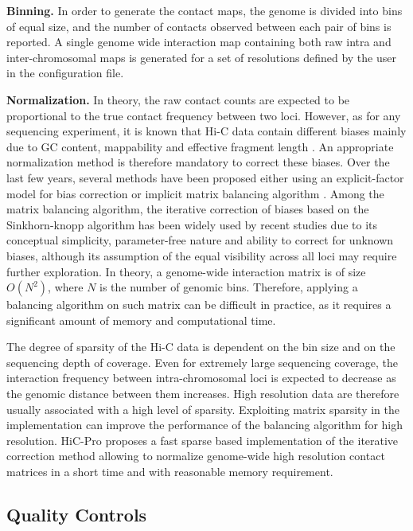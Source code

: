 \textbf{Binning.} In order to generate the contact maps, the genome is divided
into bins of equal size, and the number of contacts observed between each pair
of bins is reported. A single genome wide interaction map containing both raw
intra and inter-chromosomal maps is generated for a set of resolutions defined
by the user in the configuration file.

\textbf{Normalization.} In theory, the raw contact counts are expected to be
proportional to the true contact frequency between two loci. However, as for
any sequencing experiment, it is known that Hi-C data contain different biases
mainly due to GC content, mappability and effective fragment length
\citep{yaffe:probabilistic, hu:hicnorm}. An appropriate normalization method
is therefore mandatory to correct these biases. Over the last few years,
several methods have been proposed either using an explicit-factor model for
bias correction \citep{hu:hicnorm} or implicit matrix balancing algorithm
\citep{imakaev:iterative, cournac:normalization}. Among the matrix balancing
algorithm, the iterative correction of biases based on the Sinkhorn-knopp
algorithm has been widely used by recent studies due to its conceptual
simplicity, parameter-free nature and ability to correct for unknown biases,
although its assumption of the equal visibility across all loci may require
further exploration. In theory, a genome-wide interaction matrix is of size
$O(N^2)$, where $N$ is the number of genomic bins. Therefore, applying a
balancing algorithm on such matrix can be difficult in practice, as it
requires a significant amount of memory and computational time.

The degree of sparsity of the Hi-C data is dependent on the bin size and on
the sequencing depth of coverage. Even for extremely large sequencing
coverage, the interaction frequency between intra-chromosomal loci is expected
to decrease as the genomic distance between them increases. High resolution
data are therefore usually associated with a high level of sparsity.
Exploiting matrix sparsity in the implementation can improve the performance
of the balancing algorithm for high resolution. HiC-Pro proposes a fast sparse
based implementation of the iterative correction method
\citep{imakaev:iterative} allowing to normalize genome-wide high resolution
contact matrices in a short time and with reasonable memory requirement.

\subsection{Quality Controls}

